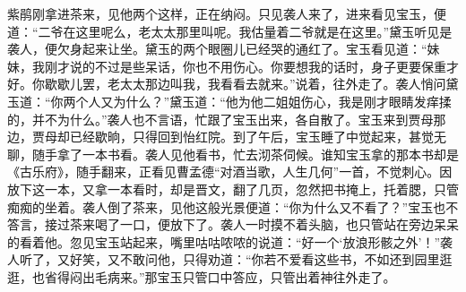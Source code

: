 \begin{parag}
    紫鹃刚拿进茶来，见他两个这样，正在纳闷。只见袭人来了，进来看见宝玉，便道：“二爷在这里呢么，老太太那里叫呢。我估量着二爷就是在这里。”黛玉听见是袭人，便欠身起来让坐。黛玉的两个眼圈儿已经哭的通红了。宝玉看见道：“妹妹，我刚才说的不过是些呆话，你也不用伤心。你要想我的话时，身子更要保重才好。你歇歇儿罢，老太太那边叫我，我看看去就来。”说着，往外走了。袭人悄问黛玉道：“你两个人又为什么？”黛玉道：“他为他二姐姐伤心，我是刚才眼睛发痒揉的，并不为什么。”袭人也不言语，忙跟了宝玉出来，各自散了。宝玉来到贾母那边，贾母却已经歇晌，只得回到怡红院。到了午后，宝玉睡了中觉起来，甚觉无聊，随手拿了一本书看。袭人见他看书，忙去沏茶伺候。谁知宝玉拿的那本书却是《古乐府》，随手翻来，正看见曹孟德“对酒当歌，人生几何”一首，不觉刺心。因放下这一本，又拿一本看时，却是晋文，翻了几页，忽然把书掩上，托着腮，只管痴痴的坐着。袭人倒了茶来，见他这般光景便道：“你为什么又不看了？”宝玉也不答言，接过茶来喝了一口，便放下了。袭人一时摸不着头脑，也只管站在旁边呆呆的看着他。忽见宝玉站起来，嘴里咕咕哝哝的说道：“好一个‘放浪形骸之外’！”袭人听了，又好笑，又不敢问他，只得劝道：“你若不爱看这些书，不如还到园里逛逛，也省得闷出毛病来。”那宝玉只管口中答应，只管出着神往外走了。
\end{parag}


